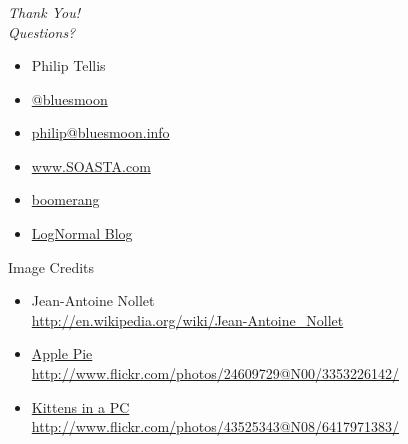 \documentclass{beamer}
\newcommand{\innersplash}[1]{
  \begin{center}
    \Large \textrm{\textit{ #1 } }
  \end{center}
}
\newcommand{\splashslide}[2][{}]{
  \begin{frame}
  \frametitle{#1}
  \innersplash{#2}
  \end{frame}
}
\begin{document}
\splashslide{Thank You! \\ Questions?}

\begin{frame}
  \begin{itemize}
  \item Philip Tellis
  \item \href{http://twitter.com/bluesmoon}{@bluesmoon}
  \item \href{http://bluesmoon.info/}{philip@bluesmoon.info}
  \item \href{http://www.soasta.com/}{www.SOASTA.com}
  \item \href{http://lognormal.github.com/boomerang/doc/}{boomerang}
  \item \href{http://www.lognormal.com/blog/}{LogNormal Blog}
  \end{itemize}
\end{frame}

\begin{frame}{Image Credits}
\begin{itemize}
  \item Jean-Antoine Nollet \\ \small \href{http://en.wikipedia.org/wiki/Jean-Antoine_Nollet}{http://en.wikipedia.org/wiki/Jean-Antoine\_Nollet}
  \item \href{http://www.flickr.com/photos/24609729@N00/3353226142/}{Apple Pie  \\ \small http://www.flickr.com/photos/24609729@N00/3353226142/}
  \item \href{http://www.flickr.com/photos/43525343@N08/6417971383/}{Kittens in a PC  \\ \small http://www.flickr.com/photos/43525343@N08/6417971383/}
\end{itemize}
\end{frame}
\end{document}
